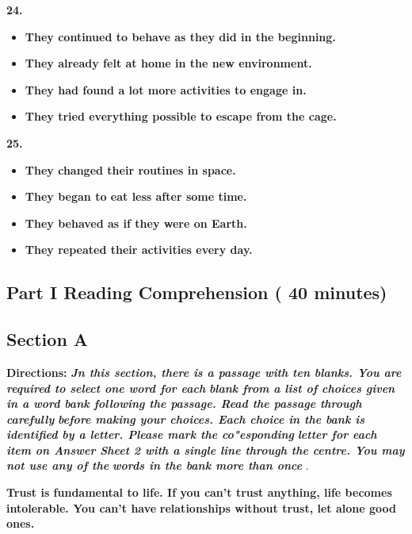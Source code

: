 \documentclass[UTF8,11pt]{ctexart}
\begin{document}
\textbf{24.}


\begin{itemize}[leftmargin=2em,itemsep=.2em,topsep=.4em]\item[A.] \textbf{They continued to behave as they did in the beginning.}
\item[B.] \textbf{They already felt at home in the new environment.}
\item[C.] \textbf{They had found a lot more activities to engage in.}
\item[D.] \textbf{They tried everything possible to escape from the cage.}
\end{itemize}

\textbf{25.}


\begin{itemize}[leftmargin=2em,itemsep=.2em,topsep=.4em]\item[A.] \textbf{They changed their routines in space.}
\item[B.] \textbf{They began to eat less after some time.}
\item[C.] \textbf{They behaved as if they were on Earth.}
\item[D.] \textbf{They repeated their activities every day.}
\end{itemize}

\subsection*{\textbf{Part }I \textbf{Reading Comprehension} \textbf{( 40 minutes)}}


\subsection*{\textbf{Section A}}


\textbf{Directions: }\textbf{\textit{Jn this section, there is a passage with ten blanks. You are required to select one word for each}} \textbf{\textit{blank from a list of choices given in a word bank following the passage. Read the passage through carefully}} \textbf{\textit{before making your choices. Each choice in the bank is identified by a letter. Please mark the co"esponding}} \textbf{\textit{letter for each item on Answer Sheet 2 with a single line through the centre. You may not use any of the}} \textbf{\textit{words in the bank more than once }}.


\textbf{Trust is fundamental to life. If you can't trust anything, life becomes intolerable. You can't have} \textbf{relationships without trust, let alone good ones.}
\end{document}
